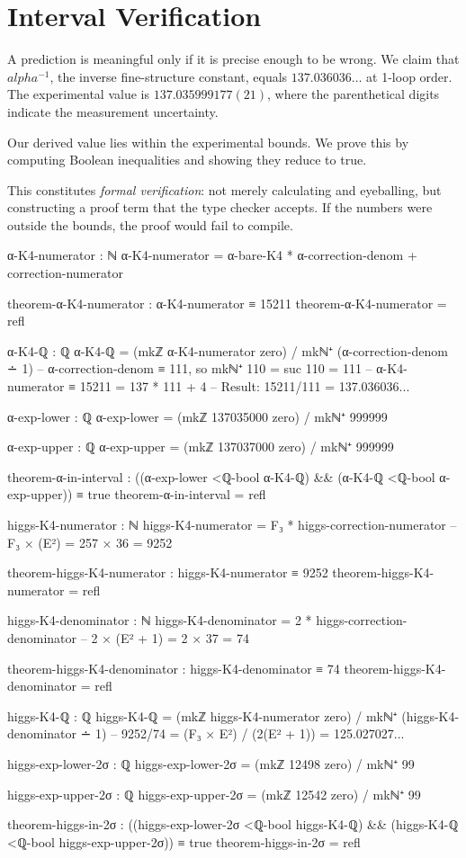 \documentclass[11pt,a4paper]{book}
\def\alpha{alpha}%
\def\texttt#1{#1}%
\begin{document}
\section{Interval Verification}

A prediction is meaningful only if it is precise enough to be wrong. We claim that $\alpha^{-1}$, 
the inverse fine-structure constant, equals $137.036036\ldots$ at 1-loop order. The experimental 
value is $137.035999177(21)$, where the parenthetical digits indicate the measurement uncertainty.

Our derived value lies within the experimental bounds. We prove this by computing Boolean 
inequalities and showing they reduce to \texttt{true}.

This constitutes \emph{formal verification}: not merely calculating and eyeballing, but constructing 
a proof term that the type checker accepts. If the numbers were outside the bounds, the proof 
would fail to compile.

\begin{code}
α-K4-numerator : ℕ
α-K4-numerator = α-bare-K4 * α-correction-denom + correction-numerator

theorem-α-K4-numerator : α-K4-numerator ≡ 15211
theorem-α-K4-numerator = refl

α-K4-ℚ : ℚ
α-K4-ℚ = (mkℤ α-K4-numerator zero) / mkℕ⁺ (α-correction-denom ∸ 1)
  -- α-correction-denom ≡ 111, so mkℕ⁺ 110 = suc 110 = 111
  -- α-K4-numerator ≡ 15211 = 137 * 111 + 4
  -- Result: 15211/111 = 137.036036...

α-exp-lower : ℚ
α-exp-lower = (mkℤ 137035000 zero) / mkℕ⁺ 999999

α-exp-upper : ℚ
α-exp-upper = (mkℤ 137037000 zero) / mkℕ⁺ 999999

theorem-α-in-interval : ((α-exp-lower <ℚ-bool α-K4-ℚ) && (α-K4-ℚ <ℚ-bool α-exp-upper)) ≡ true
theorem-α-in-interval = refl
\end{code}

\begin{code}
higgs-K4-numerator : ℕ
higgs-K4-numerator = F₃ * higgs-correction-numerator
  -- F₃ × (E²) = 257 × 36 = 9252

theorem-higgs-K4-numerator : higgs-K4-numerator ≡ 9252
theorem-higgs-K4-numerator = refl

higgs-K4-denominator : ℕ
higgs-K4-denominator = 2 * higgs-correction-denominator
  -- 2 × (E² + 1) = 2 × 37 = 74

theorem-higgs-K4-denominator : higgs-K4-denominator ≡ 74
theorem-higgs-K4-denominator = refl

higgs-K4-ℚ : ℚ
higgs-K4-ℚ = (mkℤ higgs-K4-numerator zero) / mkℕ⁺ (higgs-K4-denominator ∸ 1)
  -- 9252/74 = (F₃ × E²) / (2(E² + 1)) = 125.027027...

higgs-exp-lower-2σ : ℚ
higgs-exp-lower-2σ = (mkℤ 12498 zero) / mkℕ⁺ 99

higgs-exp-upper-2σ : ℚ
higgs-exp-upper-2σ = (mkℤ 12542 zero) / mkℕ⁺ 99

theorem-higgs-in-2σ : ((higgs-exp-lower-2σ <ℚ-bool higgs-K4-ℚ) && (higgs-K4-ℚ <ℚ-bool higgs-exp-upper-2σ)) ≡ true
theorem-higgs-in-2σ = refl
\end{code}
\end{document}
